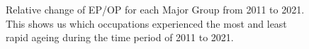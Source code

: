 \documentclass[11pt]{article}
\begin{document}
\begin{figure}[!htb]
	\centering
	\hfill
	\hfill
	\caption{Relative change of EP/OP for each Major Group from 2011 to 2021. This shows us which occupations experienced the most and least rapid ageing during the time period of 2011 to 2021.}
	\label{fig:relativechange}
\end{figure}


\end{document}
